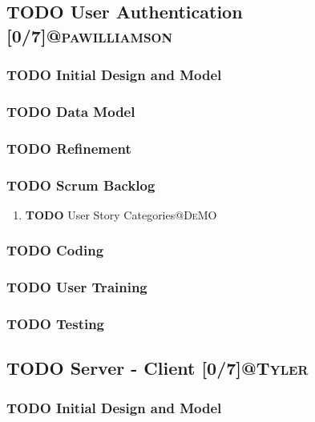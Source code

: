 \documentclass[11pt]{article}
\begin{document}
\subsection{{\bfseries\sffamily TODO} User Authentication [0/7]\hfill{}\textsc{@pawilliamson}}
\label{sec:org7c98c8c}
\subsubsection{{\bfseries\sffamily TODO} Initial Design and Model}
\label{sec:org6f5bfdc}
\subsubsection{{\bfseries\sffamily TODO} Data Model}
\label{sec:orga7b4030}
\subsubsection{{\bfseries\sffamily TODO} Refinement}
\label{sec:orga8a75e8}
\subsubsection{{\bfseries\sffamily TODO} Scrum Backlog}
\label{sec:orgc50b25b}
\begin{enumerate}
\item {\bfseries\sffamily TODO} User Story Categories\hfill{}\textsc{@DeMO}
\label{sec:org821cba6}
\end{enumerate}
\subsubsection{{\bfseries\sffamily TODO} Coding}
\label{sec:org18744c3}
\subsubsection{{\bfseries\sffamily TODO} User Training}
\label{sec:orgce463f4}
\subsubsection{{\bfseries\sffamily TODO} Testing}
\label{sec:org16c5f0e}
\subsection{{\bfseries\sffamily TODO} Server - Client [0/7]\hfill{}\textsc{@Tyler}}
\label{sec:org82392e6}
\subsubsection{{\bfseries\sffamily TODO} Initial Design and Model}
\label{sec:orgfedba3a}
\end{document}
